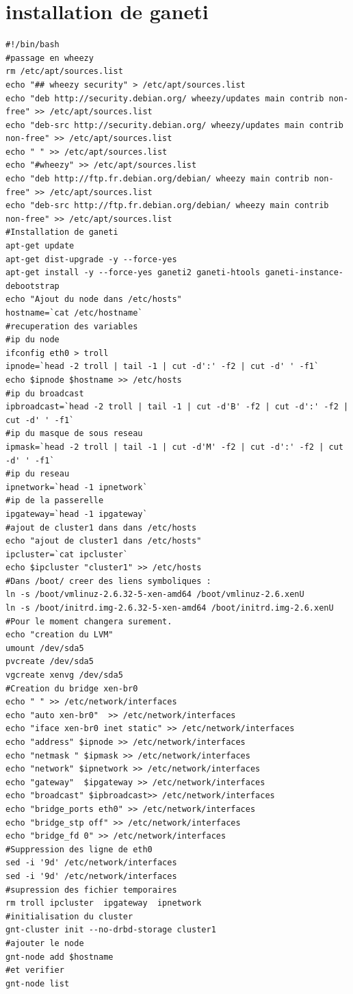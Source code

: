 \documentclass[a4paper,11pt]{report}
\begin{document}
      \section{installation de ganeti}
\begin{lstlisting}
#!/bin/bash
#passage en wheezy
rm /etc/apt/sources.list
echo "## wheezy security" > /etc/apt/sources.list
echo "deb http://security.debian.org/ wheezy/updates main contrib non-free" >> /etc/apt/sources.list
echo "deb-src http://security.debian.org/ wheezy/updates main contrib non-free" >> /etc/apt/sources.list
echo " " >> /etc/apt/sources.list
echo "#wheezy" >> /etc/apt/sources.list
echo "deb http://ftp.fr.debian.org/debian/ wheezy main contrib non-free" >> /etc/apt/sources.list
echo "deb-src http://ftp.fr.debian.org/debian/ wheezy main contrib non-free" >> /etc/apt/sources.list
#Installation de ganeti 
apt-get update
apt-get dist-upgrade -y --force-yes
apt-get install -y --force-yes ganeti2 ganeti-htools ganeti-instance-debootstrap
echo "Ajout du node dans /etc/hosts"
hostname=`cat /etc/hostname`
#recuperation des variables
#ip du node
ifconfig eth0 > troll
ipnode=`head -2 troll | tail -1 | cut -d':' -f2 | cut -d' ' -f1`
echo $ipnode $hostname >> /etc/hosts
#ip du broadcast
ipbroadcast=`head -2 troll | tail -1 | cut -d'B' -f2 | cut -d':' -f2 | cut -d' ' -f1`
#ip du masque de sous reseau
ipmask=`head -2 troll | tail -1 | cut -d'M' -f2 | cut -d':' -f2 | cut -d' ' -f1`
#ip du reseau
ipnetwork=`head -1 ipnetwork`
#ip de la passerelle
ipgateway=`head -1 ipgateway`
#ajout de cluster1 dans dans /etc/hosts
echo "ajout de cluster1 dans /etc/hosts"
ipcluster=`cat ipcluster`
echo $ipcluster "cluster1" >> /etc/hosts
#Dans /boot/ creer des liens symboliques :
ln -s /boot/vmlinuz-2.6.32-5-xen-amd64 /boot/vmlinuz-2.6.xenU
ln -s /boot/initrd.img-2.6.32-5-xen-amd64 /boot/initrd.img-2.6.xenU
#Pour le moment changera surement.
echo "creation du LVM"
umount /dev/sda5
pvcreate /dev/sda5
vgcreate xenvg /dev/sda5
#Creation du bridge xen-br0
echo " " >> /etc/network/interfaces
echo "auto xen-br0"  >> /etc/network/interfaces
echo "iface xen-br0 inet static" >> /etc/network/interfaces 
echo "address" $ipnode >> /etc/network/interfaces
echo "netmask " $ipmask >> /etc/network/interfaces
echo "network" $ipnetwork >> /etc/network/interfaces
echo "gateway"  $ipgateway >> /etc/network/interfaces
echo "broadcast" $ipbroadcast>> /etc/network/interfaces
echo "bridge_ports eth0" >> /etc/network/interfaces
echo "bridge_stp off" >> /etc/network/interfaces
echo "bridge_fd 0" >> /etc/network/interfaces
#Suppression des ligne de eth0
sed -i '9d' /etc/network/interfaces
sed -i '9d' /etc/network/interfaces
#supression des fichier temporaires
rm troll ipcluster  ipgateway  ipnetwork
#initialisation du cluster
gnt-cluster init --no-drbd-storage cluster1
#ajouter le node 
gnt-node add $hostname
#et verifier
gnt-node list
\end{lstlisting}
\end{document}
